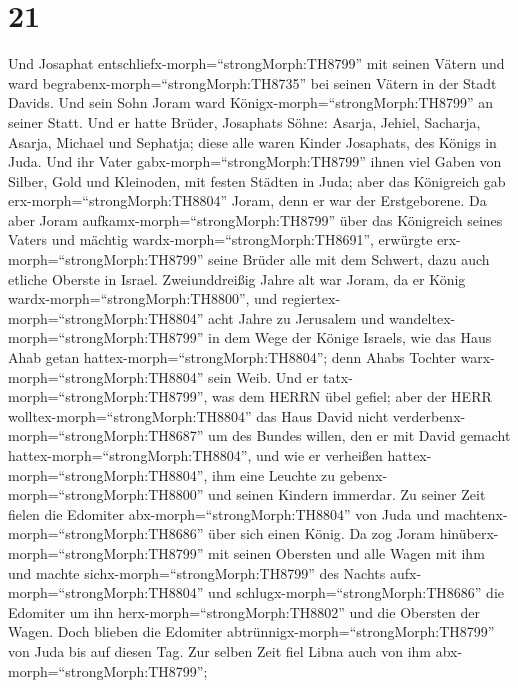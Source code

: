 \hypertarget{section-20}{%
\section{21}\label{section-20}}

 Und Josaphat entschliefx-morph=``strongMorph:TH8799'' mit
seinen Vätern und ward begrabenx-morph=``strongMorph:TH8735'' bei seinen
Vätern in der Stadt Davids. Und sein Sohn Joram ward
Königx-morph=``strongMorph:TH8799'' an seiner Statt.  Und er
hatte Brüder, Josaphats Söhne: Asarja, Jehiel, Sacharja, Asarja, Michael
und Sephatja; diese alle waren Kinder Josaphats, des Königs in Juda.
 Und ihr Vater gabx-morph=``strongMorph:TH8799'' ihnen viel
Gaben von Silber, Gold und Kleinoden, mit festen Städten in Juda; aber
das Königreich gab erx-morph=``strongMorph:TH8804'' Joram, denn er war
der Erstgeborene.  Da aber Joram
aufkamx-morph=``strongMorph:TH8799'' über das Königreich seines Vaters
und mächtig wardx-morph=``strongMorph:TH8691'', erwürgte
erx-morph=``strongMorph:TH8799'' seine Brüder alle mit dem Schwert, dazu
auch etliche Oberste in Israel.  Zweiunddreißig Jahre alt
war Joram, da er König wardx-morph=``strongMorph:TH8800'', und
regiertex-morph=``strongMorph:TH8804'' acht Jahre zu Jerusalem
 und wandeltex-morph=``strongMorph:TH8799'' in dem Wege der
Könige Israels, wie das Haus Ahab getan
hattex-morph=``strongMorph:TH8804''; denn Ahabs Tochter
warx-morph=``strongMorph:TH8804'' sein Weib. Und er
tatx-morph=``strongMorph:TH8799'', was dem HERRN übel gefiel;
 aber der HERR wolltex-morph=``strongMorph:TH8804'' das Haus
David nicht verderbenx-morph=``strongMorph:TH8687'' um des Bundes
willen, den er mit David gemacht hattex-morph=``strongMorph:TH8804'',
und wie er verheißen hattex-morph=``strongMorph:TH8804'', ihm eine
Leuchte zu gebenx-morph=``strongMorph:TH8800'' und seinen Kindern
immerdar.  Zu seiner Zeit fielen die Edomiter
abx-morph=``strongMorph:TH8804'' von Juda und
machtenx-morph=``strongMorph:TH8686'' über sich einen König.
 Da zog Joram hinüberx-morph=``strongMorph:TH8799'' mit
seinen Obersten und alle Wagen mit ihm und machte
sichx-morph=``strongMorph:TH8799'' des Nachts
aufx-morph=``strongMorph:TH8804'' und
schlugx-morph=``strongMorph:TH8686'' die Edomiter um ihn
herx-morph=``strongMorph:TH8802'' und die Obersten der Wagen.
 Doch blieben die Edomiter
abtrünnigx-morph=``strongMorph:TH8799'' von Juda bis auf diesen Tag. Zur
selben Zeit fiel Libna auch von ihm abx-morph=``strongMorph:TH8799'';
